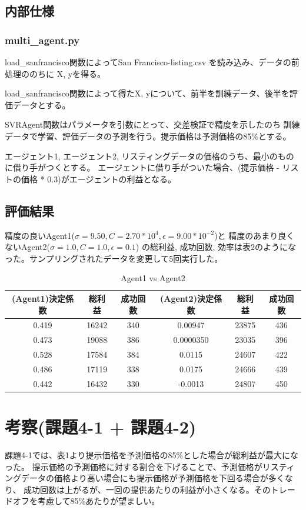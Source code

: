 \documentclass{jsarticle}
\begin{document}
\subsection{内部仕様}
\subsubsection*{multi\_agent.py}
load\_sanfrancisco関数によってSan Francisco-listing.csv を読み込み、データの前処理ののちに
X, yを得る。

load\_sanfrancisco関数によって得たX, yについて、前半を訓練データ、後半を評価データとする。

SVRAgent関数はパラメータを引数にとって、交差検証で精度を示したのち
訓練データで学習、評価データの予測を行う。提示価格は予測価格の85\%とする。

エージェント1, エージェント2, リスティングデータの価格のうち、最小のものに借り手がつくとする。
エージェントに借り手がついた場合、(提示価格 - リストの価格 * 0.3)がエージェントの利益となる。
\subsection{評価結果}
精度の良いAgent1($\sigma = 9.50, C = 2.70 * 10^4, \epsilon = 9.00 * 10^{-2}$)と
精度のあまり良くないAgent2($\sigma = 1.0, C = 1.0, \epsilon = 0.1$)
の総利益, 成功回数, 効率は表2のようになった。サンプリングされたデータを変更して5回実行した。
\begin{table}[H]
    \centering
    \begin{tabular}{|c||c|c||c||c|c|} \hline
      (Agent1)決定係数 & 総利益 & 成功回数 & (Agent2)決定係数 & 総利益 & 成功回数 \\ \hline
      0.419 & 16242 & 340 & 0.00947 & 23875 & 436 \\
      0.473 & 19088 & 386 & 0.0000350 & 23035 & 396 \\
      0.528 & 17584 & 384 & 0.0115 & 24607 & 422 \\
      0.486 & 17119 & 338 & 0.0175 & 24666 & 439 \\
      0.442 & 16432 & 330 & -0.0013 & 24807 & 450 \\ \hline
    \end{tabular}
    \caption{Agent1 vs Agent2}
\end{table}

\section{考察(課題4-1 + 課題4-2)}
課題4-1では、表1より提示価格を予測価格の85\%とした場合が総利益が最大になった。
提示価格の予測価格に対する割合を下げることで、予測価格がリスティングデータの価格より高い場合にも提示価格が予測価格を下回る場合が多くなり、
成功回数は上がるが、一回の提供あたりの利益が小さくなる。そのトレードオフを考慮して85\%あたりが望ましい。
\end{document}
